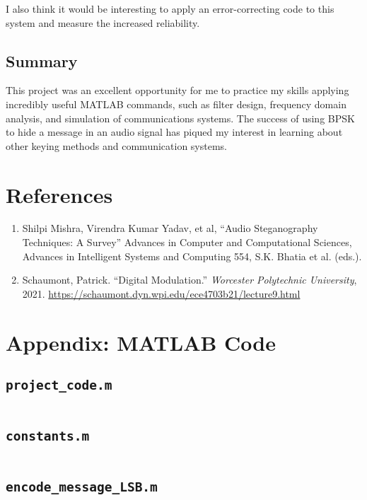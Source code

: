 \documentclass{article}
\begin{document}
\vspace{6pt}

I also think it would be interesting to apply an error-correcting code to this
system and measure the increased reliability.

\subsection{Summary}
This project was an excellent opportunity for me to practice my skills applying
incredibly useful MATLAB commands, such as filter design, frequency domain analysis,
and simulation of communications systems. The success of using BPSK to hide a message
in an audio signal has piqued my interest in learning about other keying methods
and communication systems.

\section{References}

\begin{enumerate}
  \item Shilpi Mishra, Virendra Kumar Yadav, et al, ``Audio Steganography Techniques: A
Survey'' Advances in Computer and Computational Sciences, Advances in Intelligent
Systems and Computing 554, S.K. Bhatia et al. (eds.).
  \item Schaumont, Patrick. ``Digital Modulation.'' \textit{Worcester Polytechnic University}, 2021. \url{https://schaumont.dyn.wpi.edu/ece4703b21/lecture9.html}
\end{enumerate}

\newpage
\section{Appendix: MATLAB Code}
\subsection{\texttt{project\_code.m}}
\inputminted[xleftmargin=24pt, linenos=true, breaklines]{matlab}{project_code.m}

\newpage
\subsection{\texttt{constants.m}}
\inputminted[xleftmargin=24pt, linenos=true, breaklines]{matlab}{src/constants.m}

\newpage
\subsection{\texttt{encode\_message\_LSB.m}}
\inputminted[xleftmargin=24pt, linenos=true, breaklines]{matlab}{src/encode_message_LSB.m}
\end{document}
